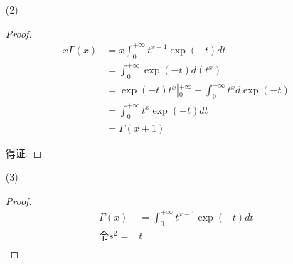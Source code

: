 \documentclass{article}
\begin{document}
\begin{enumerate}
\begin{enumerate}
\begin{proof}
\begin{equation}
                \begin{aligned}
                    \lim_{t\rightarrow0^+}\frac{t^{x-1}e^{-t}}{\frac{1}{t^p}}
                    &=\lim_{t\rightarrow0^+}t^{x+p-1} \\
                    &=0
                \end{aligned}
                \nonumber
            \end{equation} \par
            取 $\epsilon>0$ :
            \begin{equation}
                \begin{aligned}
                    \lim_{t\rightarrow+\infty}\frac{t^{x-1}e^{-t}}{\frac{1}{t^{1+\epsilon}}}
                    &=\lim_{t\rightarrow+\infty}\frac{t^{x+\epsilon}}{e^t} \\
                    &=0
                \end{aligned}
                \nonumber
            \end{equation} \par
            综上, 得证.
        \end{proof}
        \item[(2)] \begin{proof}
            \begin{equation}
                \begin{aligned}
                    x\Gamma(x)
                    &=x\int_{0}^{+\infty}t^{x-1}\exp(-t)dt \\
                    &=\int_{0}^{+\infty}\exp(-t)d(t^x) \\
                    &=\exp(-t)t^x\left|_{0}^{+\infty}\right.-\int_{0}^{+\infty}t^xd\exp(-t) \\
                    &=\int_{0}^{+\infty}t^x\exp(-t)dt \\
                    &=\Gamma(x+1)
                \end{aligned}
                \nonumber
            \end{equation} \par
            得证.
        \end{proof}
        \item[(3)] \begin{proof}
            \begin{equation}
                \begin{aligned}
                    \Gamma(x)
                    &=\int_{0}^{+\infty}t^{x-1}\exp(-t)dt \\
                    \text{令} s^2=&t \\

\end{aligned}
\end{equation}
\end{proof}
\end{enumerate}
\end{enumerate}
\end{document}
